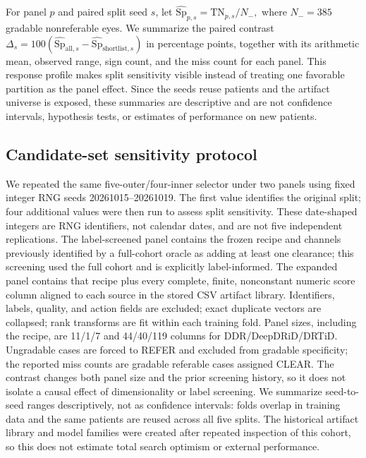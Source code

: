 \documentclass[11pt]{article}
\begin{document}
For panel $p$ and paired split seed $s$, let $\widehat{\mathrm{Sp}}_{p,s}=\mathrm{TN}_{p,s}/N_-,$ where $N_-=385$ gradable nonreferable eyes. We summarize the paired contrast $\Delta_s=100(\widehat{\mathrm{Sp}}_{\mathrm{all},s}-\widehat{\mathrm{Sp}}_{\mathrm{shortlist},s})$ in percentage points, together with its arithmetic mean, observed range, sign count, and the miss count for each panel. This response profile makes split sensitivity visible instead of treating one favorable partition as the panel effect. Since the seeds reuse patients and the artifact universe is exposed, these summaries are descriptive and are not confidence intervals, hypothesis tests, or estimates of performance on new patients.

\subsection{Candidate-set sensitivity protocol}
We repeated the same five-outer/four-inner selector under two panels using fixed integer RNG seeds 20261015--20261019. The first value identifies the original split; four additional values were then run to assess split sensitivity. These date-shaped integers are RNG identifiers, not calendar dates, and are not five independent replications. The label-screened panel contains the frozen recipe and channels previously identified by a full-cohort oracle as adding at least one clearance; this screening used the full cohort and is explicitly label-informed. The expanded panel contains that recipe plus every complete, finite, nonconstant numeric score column aligned to each source in the stored CSV artifact library. Identifiers, labels, quality, and action fields are excluded; exact duplicate vectors are collapsed; rank transforms are fit within each training fold. Panel sizes, including the recipe, are 11/1/7 and 44/40/119 columns for DDR/DeepDRiD/DRTiD. Ungradable cases are forced to REFER and excluded from gradable specificity; the reported miss counts are gradable referable cases assigned CLEAR. The contrast changes both panel size and the prior screening history, so it does not isolate a causal effect of dimensionality or label screening. We summarize seed-to-seed ranges descriptively, not as confidence intervals: folds overlap in training data and the same patients are reused across all five splits. The historical artifact library and model families were created after repeated inspection of this cohort, so this does not estimate total search optimism or external performance.
\end{document}
